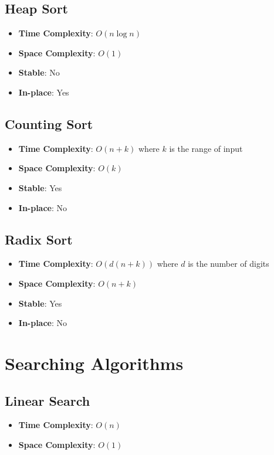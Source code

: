 \documentclass[11pt]{article}
\theoremstyle{definition}
\begin{document}
\subsection{Heap Sort}
\begin{itemize}
    \item \textbf{Time Complexity}: $O(n \log n)$
    \item \textbf{Space Complexity}: $O(1)$
    \item \textbf{Stable}: No
    \item \textbf{In-place}: Yes
\end{itemize}

\subsection{Counting Sort}
\begin{itemize}
    \item \textbf{Time Complexity}: $O(n + k)$ where $k$ is the range of input
    \item \textbf{Space Complexity}: $O(k)$
    \item \textbf{Stable}: Yes
    \item \textbf{In-place}: No
\end{itemize}

\subsection{Radix Sort}
\begin{itemize}
    \item \textbf{Time Complexity}: $O(d(n + k))$ where $d$ is the number of digits
    \item \textbf{Space Complexity}: $O(n + k)$
    \item \textbf{Stable}: Yes
    \item \textbf{In-place}: No
\end{itemize}

\section{Searching Algorithms}

\subsection{Linear Search}
\begin{itemize}
    \item \textbf{Time Complexity}: $O(n)$
    \item \textbf{Space Complexity}: $O(1)$
\end{itemize}
\end{document}
